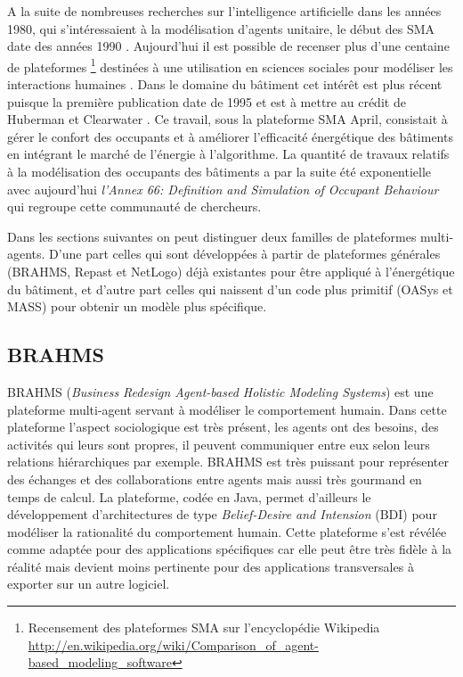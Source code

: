A la suite de nombreuses recherches sur l'intelligence artificielle dans les années 1980, qui s'intéressaient à la modélisation d'agents unitaire, le début des SMA date des années 1990 \cite{Alonso-14}. Aujourd'hui il est possible de recenser plus d'une centaine de plateformes \footnote{Recensement des plateformes SMA sur l'encyclopédie Wikipedia \url{http://en.wikipedia.org/wiki/Comparison_of_agent-based_modeling_software}} destinées à une utilisation en sciences sociales pour modéliser les interactions humaines \cite{Bonabeau-02}. Dans le domaine du bâtiment cet intérêt est plus récent puisque la première publication date de 1995 et est à mettre au crédit de Huberman et Clearwater \cite{Huberman-95}. Ce travail, sous la plateforme SMA April, consistait à gérer le confort des occupants et à améliorer l'efficacité énergétique des bâtiments en intégrant le marché de l'énergie à l'algorithme. La quantité de travaux relatifs à la modélisation des occupants des bâtiments a par la suite été exponentielle avec aujourd'hui \textit{l'Annex 66: Definition and Simulation of Occupant Behaviour} qui regroupe cette communauté de chercheurs.

Dans les sections suivantes on peut distinguer deux familles de plateformes multi-agents. D'une part celles qui sont développées à partir de plateformes générales (BRAHMS, Repast et NetLogo) déjà existantes pour être appliqué à l'énergétique du bâtiment, et d'autre part celles qui naissent d'un code plus primitif (OASys et MASS) pour obtenir un modèle plus spécifique.

\subsection{BRAHMS}
\label{BRAHMS}

BRAHMS (\textit{Business Redesign Agent-based Holistic Modeling Systems}) est une plateforme multi-agent servant à modéliser le comportement humain. Dans cette plateforme l'aspect sociologique est très présent, les agents ont des besoins, des activités qui leurs sont propres, il peuvent communiquer entre eux selon leurs relations hiérarchiques par exemple. BRAHMS est très puissant pour représenter des échanges et des collaborations entre agents mais aussi très gourmand en temps de calcul. La plateforme, codée en Java, permet d'ailleurs le développement d'architectures de type \textit{Belief-Desire and Intension} (BDI) pour modéliser la rationalité du comportement humain. Cette plateforme s'est révélée comme adaptée pour des applications spécifiques car elle peut être très fidèle à la réalité mais devient moins pertinente pour des applications transversales à exporter sur un autre logiciel. 

